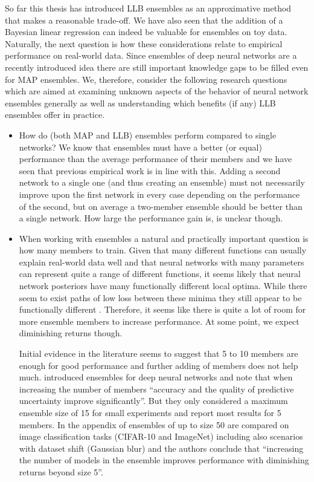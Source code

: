 \documentclass[../thesis.tex]{subfiles}
\begin{document}
So far this thesis has introduced LLB ensembles as an approximative method that makes a reasonable trade-off. We have also seen that the addition of a Bayesian linear regression can indeed be valuable for ensembles on toy data. Naturally, the next question is how these considerations relate to empirical performance on real-world data. Since ensembles of deep neural networks are a recently introduced idea there are still important knowledge gaps to be filled even for MAP ensembles. We, therefore, consider the following research questions which are aimed at examining unknown aspects of the behavior of neural network ensembles generally as well as understanding which benefits (if any) LLB ensembles offer in practice.

\begin{itemize}
    \item How do (both MAP and LLB) ensembles perform compared to single networks? We know that ensembles must have a better (or equal) performance than the average performance of their members and we have seen that previous empirical work is in line with this. Adding a second network to a single one (and thus creating an ensemble) must not necessarily improve upon the first network in every case depending on the performance of the second, but on average a two-member ensemble should be better than a single network. How large the performance gain is, is unclear though.
    \item When working with ensembles a natural and practically important question is how many members to train. Given that many different functions can usually explain real-world data well and that neural networks with many parameters can represent quite a range of different functions, it seems likely that neural network posteriors have many functionally different local optima. %
    While there seem to exist paths of low loss between these minima \parencite{draxler2018essentially} they still appear to be functionally different \parencite{fort2019deep}. Therefore, it seems like there is quite a lot of room for more ensemble members to increase performance. At some point, we expect diminishing returns though. 
    
    Initial evidence in the literature seems to suggest that 5 to 10 members are enough for good performance and further adding of members does not help much. \textcite{lakshminarayanan2017simple} introduced ensembles for deep neural networks and note that when increasing the number of members ``accuracy and the quality of predictive uncertainty improve significantly''. But they only considered a maximum ensemble size of 15 for small experiments and report most results for 5 members. In the appendix of \textcite{ovadia2019can} ensembles of up to size 50 are compared on image classification tasks (CIFAR-10 and ImageNet) including also scenarios with dataset shift (Gaussian blur) and the authors conclude that ``increasing the number of models in the ensemble improves performance with diminishing returns beyond size 5''. 
    

\end{itemize}
\end{document}
